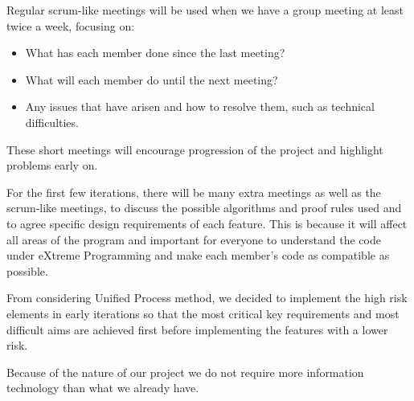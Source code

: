 Regular scrum-like meetings will be used when we have a group meeting at least twice a week, focusing on:

\begin{itemize}
\item What has each member done since the last meeting?
\item What will each member do until the next meeting?
\item Any issues that have arisen and how to resolve them, such as technical difficulties.
\end{itemize}

These short meetings will encourage progression of the project and highlight problems early on.

For the first few iterations, there will be many extra meetings as well as the scrum-like meetings, to discuss the possible algorithms and proof rules used and to agree specific design requirements of each feature. This is because it will affect all areas of the program and important for everyone to understand the code under eXtreme Programming and make each member's code as compatible as possible.

From considering Unified Process method, we decided to implement the high risk elements in early iterations so that the most critical key requirements and most difficult aims are achieved first before implementing the features with a lower risk.

Because of the nature of our project we do not require more information technology than what we already have.
